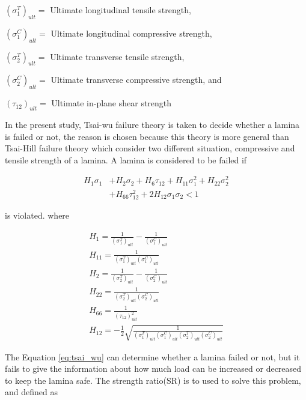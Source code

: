 \documentclass[Afour,sageh,times]{sagej}
\begin{document}
$(\sigma_1^T)_{ult}=$ Ultimate longitudinal tensile strength,

$(\sigma_1^C)_{ult}=$ Ultimate longitudinal compressive strength,

$(\sigma_2^T)_{ult}=$ Ultimate transverse tensile strength,

$(\sigma_2^C)_{ult}=$ Ultimate transverse compressive strength, and

$(\tau_{12})_{ult}=$ Ultimate in-plane shear strength

In the present study, Tsai-wu failure theory is taken to decide whether a lamina is failed or not, the
reason is chosen because this theory is  more general than Tsai-Hill failure theory which consider
two different situation, compressive and tensile strength of a lamina. A lamina is considered to be
failed if


\begin{equation} \label{eq:tsai_wu}
\begin{split}
	H_1 \sigma_1 & + H_2 \sigma_2 + H_6 \tau_{12} + H_{11}\sigma_1^2 + H_{22} \sigma_2^2 \\
                 & + H_{66}  \tau_{12}^2 + 2H_{12}\sigma_1\sigma_2 < 1
\end{split}
\end{equation}
 
is violated. where


\begin{equation}
	\begin{array}{l}
		H_{1}=\frac{1}{\left(\sigma_{1}^{T}\right)_{u l t}}-\frac{1}{\left(\sigma_{1}^{C}\right)_{u l
	t}} \\
	H_{11}=\frac{1}{\left(\sigma_{1}^{T}\right)_{u l t}\left(\sigma_{1}^{C}\right)_{u l t}} \\
	H_{2}=\frac{1}{\left(\sigma_{2}^{T}\right)_{u l t}}-\frac{1}{\left(\sigma_{2}^{C}\right)_{u l
	t}} \\
	H_{22}=\frac{1}{\left(\sigma_{2}^{T}\right)_{u l t}\left(\sigma_{2}^{C}\right)_{u l t}} \\
	H_{66}=\frac{1}{\left(\tau_{12}\right)_{u l t}^{2}} \\
	H_{12}=-\frac{1}{2} \sqrt{\frac{1}{\left(\sigma_{1}^{T}\right)_{u l
				t}\left(\sigma_{1}^{C}\right)_{u l t}\left(\sigma_{2}^{T}\right)_{u l
	t}\left(\sigma_{2}^{C}\right)_{u l t}}}
	\end{array}
\end{equation}


The Equation \ref{eq:tsai_wu} can determine whether a lamina failed or not, but it fails to give the
information about how much load can be increased or decreased to keep the lamina safe. The strength
ratio(SR) is to used to solve this problem, and defined as
\end{document}
